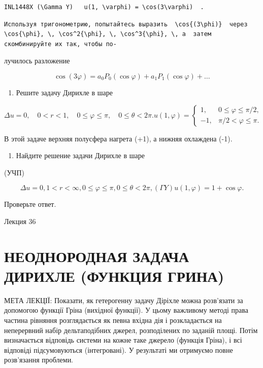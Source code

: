 \documentclass[
  ukrainian,
]{article}
\providecommand{\tightlist}{%
  \setlength{\itemsep}{0pt}\setlength{\parskip}{0pt}}
\begin{document}
\begin{verbatim}
INL1448X (\Gamma Y)   u(1, \varphi) = \cos(3\varphi)  .
\end{verbatim}

\begin{verbatim}
Используя тригонометрию, попытайтесь выразить  \cos{(3\phi)}  через  \cos{\phi}, \, \cos^2{\phi}, \, \cos^3{\phi}, \, a  затем скомбинируйте их так, чтобы по-
\end{verbatim}

лучилось разложение

\[
\cos(3\varphi) = a_0 P_0(\cos\varphi) + a_1 P_1(\cos\varphi) + \dots
\]

\begin{enumerate}
\def\labelenumi{\arabic{enumi}.}
\setcounter{enumi}{4}
\tightlist
\item
  Решите задачу Дирихле в шаре
\end{enumerate}

\[
\Delta u = 0, \quad 0 < r < 1, \quad 0 \le \varphi \le \pi, \quad 0 \le \theta < 2\pi.
u(1, \varphi) =
\begin{cases} 1, & 0 \le \varphi \le \pi/2, \\ -1, & \pi/2 < \varphi \le \pi. \end{cases}
\]

В этой задаче верхняя полусфера нагрета (+1), а нижняя охлаждена (-1).

\begin{enumerate}
\def\labelenumi{\arabic{enumi}.}
\setcounter{enumi}{5}
\tightlist
\item
  Найдите решение задачи Дирихле в шаре
\end{enumerate}

(УЧП)

\[
\Delta u = 0
,  1 < r < \infty  ,  0 \le \varphi \le \pi  ,  0 \le \theta < 2\pi  ,  (\Gamma Y)   u(1, \varphi) = 1 + \cos \varphi  .
\]

Проверьте ответ.

Лекция 36

\section{НЕОДНОРОДНАЯ ЗАДАЧА ДИРИХЛЕ (ФУНКЦИЯ
ГРИНА)}\label{ux43dux435ux43eux434ux43dux43eux440ux43eux434ux43dux430ux44f-ux437ux430ux434ux430ux447ux430-ux434ux438ux440ux438ux445ux43bux435-ux444ux443ux43dux43aux446ux438ux44f-ux433ux440ux438ux43dux430}

МЕТА ЛЕКЦІЇ: Показати, як гетерогенну задачу Діріхле можна розв'язати за
допомогою функції Гріна (вихідної функції). У цьому важливому методі
права частина рівняння розглядається як певна вхідна дія і розкладається
на неперервний набір дельтаподібних джерел, розподілених по заданій
площі. Потім визначається відповідь системи на кожне таке джерело
(функція Гріна), і всі відповіді підсумовуються (інтегровані). У
результаті ми отримуємо повне розв'язання проблеми.
\end{document}
